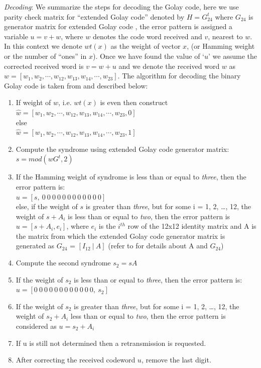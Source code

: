 \emph{Decoding}: We summarize the steps for decoding the Golay code, here we use parity check matrix for ``extended Golay code'' denoted by $H = G^t_{24}$ where $G_{24}$ is generator matrix for extended Golay code \cite{golay}, the error pattern is assigned a variable $u = v + w$, where $w$ denotes the code word received and $v$, nearest to $w$. In this context we denote $wt(x)$ as the weight of vector $x$, (or Hamming weight or the number of ``ones'' in $x$). Once we have found the value of `$u$' we assume the
corrected received word is $v = w + u$ and we denote the received word $w$ as $w = [w_1, w_2, \cdots , w_{12}, w_{13}, w_{14}, \cdots , w_{23}]$. The algorithm for decoding the binary Golay code is taken from \cite{golay} and described below:
\begin{enumerate}
	\item If weight of $w$, i.e. $wt(x)$ is even then construct\\
		\tab $\hat{w} = [ w_1, w_2, \cdots , w_{12}, w_{13}, w_{14}, \cdots , w_{23}, 0]$\\
		  else\\
		\tab $\hat{w} = [ w_1, w_2, \cdots , w_{12}, w_{13}, w_{14}, \cdots , w_{23}, 1]$\\
	\item Compute the syndrome using extended Golay code generator matrix:\\
		\tab \tab \tab \tab $s = mod(wG^t, 2)$
	\item If the Hamming weight of syndrome is less than or equal to \emph{three}, then the error pattern is:\\
		\tab \tab \tab $u = [s,\  0\  0\  0\  0\  0\  0\  0\  0\  0\  0\  0\  0]$\\
		else, if the weight of $s$ is greater than \emph{three}, but for some i = 1, 2, \ldots, 12, the weight of $s + A_i$ is less than or equal to \emph{two}, then the error pattern is $u = [ s + A_i, e_i]$, where $e_i$ is the $i^{th}$ row of the 12x12 identity matrix and A is the matrix from which the extended Golay code generator matrix is generated as $G_{24}$ = $[I_{12}\:|\:A]$ (refer to \cite{golay} for details about A and $G_{24}$)
	\item Compute the second  syndrome $s_2 = s A$
	\item If the weight of $s_2$ is less than or equal to \emph{three}, then the error pattern is:\\
		\tab \tab \tab $u = [ 0\  0\  0\  0\  0\  0\  0\  0\  0\  0\  0\  0,\ s_2]$
	\item If the weight of $s_2$ is greater than \emph{three}, but for some i = 1, 2, \ldots, 12, the weight of $s_2 + A_i$ less than or equal to \emph{two}, then the error pattern is considered as $u = s_2 + A_i$
	\item If u is still not determined then a retransmission is requested.

	\item After correcting the received codeword $u$, remove the last digit.
\end{enumerate}

